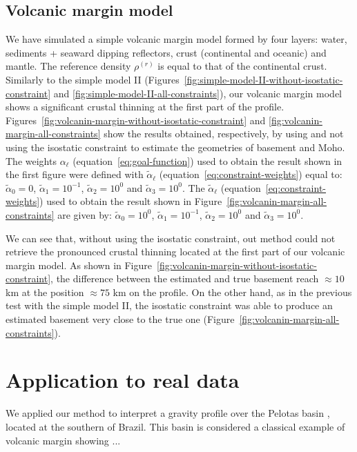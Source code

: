 \documentclass[manuscript]{geophysics}
\begin{document}
\subsection*{Volcanic margin model}

We have simulated a simple volcanic margin model formed by four layers: 
water, sediments + seaward dipping reflectors, crust (continental and oceanic) 
and mantle. The reference density $\rho^{(r)}$ is equal to
that of the continental crust.
Similarly to the simple model II (Figures~\ref{fig:simple-model-II-without-isostatic-constraint}
and \ref{fig:simple-model-II-all-constraints}), our volcanic margin model
shows a significant crustal thinning at the first part of
the profile.
Figures~\ref{fig:volcanin-margin-without-isostatic-constraint} and 
\ref{fig:volcanin-margin-all-constraints} show the results obtained,
respectively, by using and not using the isostatic constraint to estimate
the geometries of basement and Moho.
The weights $\alpha_{\ell}$ (equation~\ref{eq:goal-function}) used
to obtain the result shown in the first figure were defined with
$\tilde{\alpha}_{\ell}$ (equation~\ref{eq:constraint-weights}) equal to: 
$\tilde{\alpha}_{0} = 0$, $\tilde{\alpha}_{1} = 10^{-1}$, 
$\tilde{\alpha}_{2} = 10^{0}$ and $\tilde{\alpha}_{3} = 10^{0}$.
The $\tilde{\alpha}_{\ell}$ (equation~\ref{eq:constraint-weights}) used to
obtain the result shown in Figure~\ref{fig:volcanin-margin-all-constraints} 
are given by: $\tilde{\alpha}_{0} = 10^{0}$, $\tilde{\alpha}_{1} = 10^{-1}$, 
$\tilde{\alpha}_{2} = 10^{0}$ and $\tilde{\alpha}_{3} = 10^{0}$.

We can see that, without using the isostatic constraint, out method could not 
retrieve the pronounced crustal thinning located at the first part of our
volcanic margin model. As shown in 
Figure~\ref{fig:volcanin-margin-without-isostatic-constraint},
the difference between the estimated and true basement reach
$\approx 10$ km at the position $\approx 75$ km on the profile.
On the other hand, as in the previous test with the simple model II, 
the isostatic constraint was able to produce an estimated basement
very close to the true one (Figure~\ref{fig:volcanin-margin-all-constraints}).


\section{Application to real data}

We applied our method to interpret a gravity profile over the Pelotas basin
\citep{stica-etal2014}, located at the southern of Brazil. This basin is considered
a classical example of volcanic margin \citep{geoffroy2005} showing ...
\end{document}
